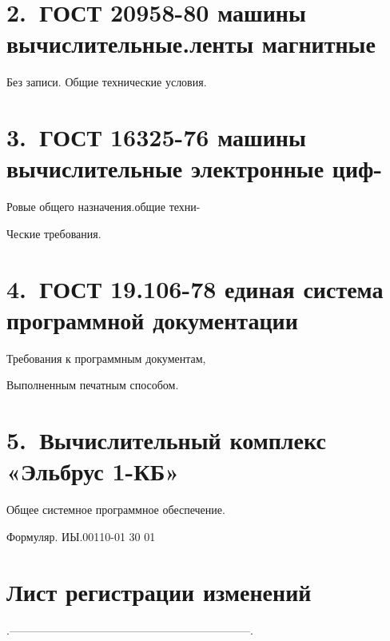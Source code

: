 \documentclass[11pt,a4paper]{article}
\begin{document}
\section*{2.~ГОСТ 20958-80 машины вычислительные.ленты магнитные}
\begin{center}Без записи. Общие технические условия.\end{center}
\section*{3.~ГОСТ 16325-76 машины вычислительные электронные циф-}
\begin{center}Ровые общего назначения.общие техни-\end{center}
\begin{center}Ческие требования.\end{center}
\section*{4.~ГОСТ 19.106-78 единая система программной документации}
\begin{center}Требования к программным документам,\end{center}
\begin{center}Выполненным печатным способом.\end{center}
\section*{5.~Вычислительный комплекс «Эльбрус 1-КБ»}
Общее системное программное обеспечение.

Формуляр. ИЫ.00110-01 30 01

\section*{Лист регистрации изменений}
.-----------------------------------------------------------------.
\end{document}
